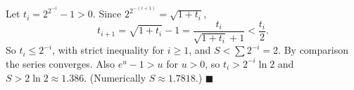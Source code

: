 Let $t_i=2^{2^{-i}}-1>0$. Since $2^{2^{-(i+1)}}=\sqrt{1+t_i}$,
\[t_{i+1}=\sqrt{1+t_i}-1=\dfrac{t_i}{\sqrt{1+t_i}+1}<\dfrac{t_i}2.\]
So $t_i\le2^{-i}$, with strict inequality for $i\ge1$, and $S<\sum2^{-i}=2$. By comparison the series converges. Also $e^u-1>u$ for $u>0$, so $t_i>2^{-i}\ln2$ and $S>2\ln2\approx1.386$. (Numerically $S\approx1.7818$.) $\blacksquare$
